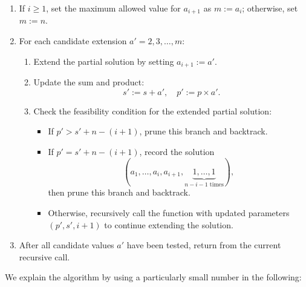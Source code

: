 \documentclass[10pt]{article}
\theoremstyle{definition}
\theoremstyle{remark}
\numberwithin{equation}{section}
\begin{document}
\begin{enumerate}
  \item If $i \geq 1$, set the maximum allowed value for $a_{i+1}$ as $m := a_i$; otherwise, set $m := n$.

  \item For each candidate extension $a' = 2, 3, \dots, m$:
  \begin{enumerate}
    \item Extend the partial solution by setting $a_{i+1} := a'$.

    \item Update the sum and product:
    \[
    s' := s + a', \quad p' := p \times a'.
    \]

    \item Check the feasibility condition for the extended partial solution:
    \begin{itemize}
      \item If \(p' > s' + n - (i+1)\), prune this branch and backtrack.

      \item If \(p' = s' + n - (i+1)\), record the solution
      \[
      (a_1, \dots, a_i, a_{i+1}, \underbrace{1, \dots, 1}_{n - i - 1 \text{ times}}),
      \]
      then prune this branch and backtrack.

      \item Otherwise, recursively call the function with updated parameters $(p', s', i+1)$ to continue extending the solution.
    \end{itemize}

  \end{enumerate}

  \item After all candidate values $a'$ have been tested, return from the current recursive call.
\end{enumerate}
We explain the algorithm by using a particularly small number in the following:
\end{document}
